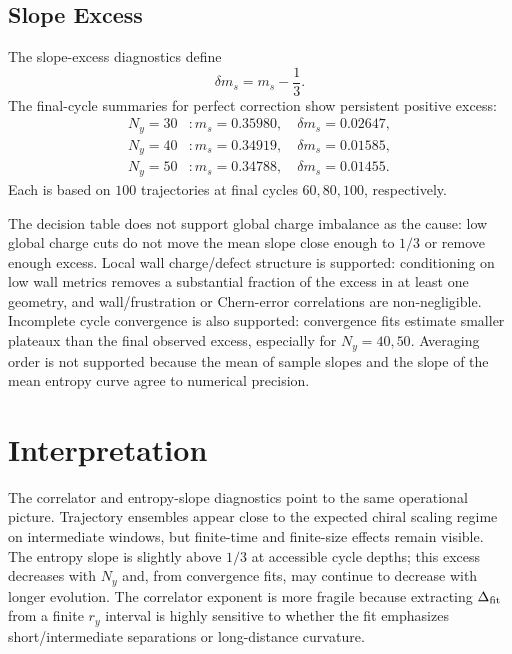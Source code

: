 \documentclass[aps,prb,onecolumn,nofootinbib,superscriptaddress]{revtex4-2}
\begin{document}
\subsection{\texorpdfstring{Slope Excess}{Slope Excess}}

The slope-excess diagnostics define
\begin{equation}
  \delta m_s = m_s - \frac{1}{3}.
\end{equation}
The final-cycle summaries for perfect correction show persistent positive excess:
\begin{align}
N_y=30 &: m_s=0.35980,\quad \delta m_s=0.02647,\\
N_y=40 &: m_s=0.34919,\quad \delta m_s=0.01585,\\
N_y=50 &: m_s=0.34788,\quad \delta m_s=0.01455.
\end{align}
Each is based on \(100\) trajectories at final cycles \(60,80,100\), respectively.

The decision table does not support global charge imbalance as the cause: low global charge cuts do not move the mean slope close enough to \(1/3\) or remove enough excess. Local wall charge/defect structure is supported: conditioning on low wall metrics removes a substantial fraction of the excess in at least one geometry, and wall/frustration or Chern-error correlations are non-negligible. Incomplete cycle convergence is also supported: convergence fits estimate smaller plateaux than the final observed excess, especially for \(N_y=40,50\). Averaging order is not supported because the mean of sample slopes and the slope of the mean entropy curve agree to numerical precision.

\section{Interpretation}

The correlator and entropy-slope diagnostics point to the same operational picture. Trajectory ensembles appear close to the expected chiral scaling regime on intermediate windows, but finite-time and finite-size effects remain visible. The entropy slope is slightly above \(1/3\) at accessible cycle depths; this excess decreases with \(N_y\) and, from convergence fits, may continue to decrease with longer evolution. The correlator exponent is more fragile because extracting \(\Delta_{\rm fit}\) from a finite \(r_y\) interval is highly sensitive to whether the fit emphasizes short/intermediate separations or long-distance curvature.
\end{document}
